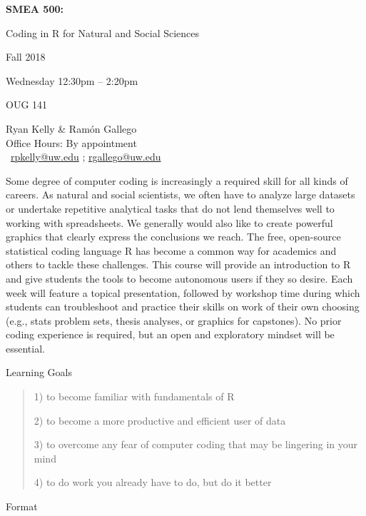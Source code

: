 \documentclass[11pt,letterpaper]{article}
\newcommand{\R}[0]{\textsf{R }}
\begin{document}
\begin{center} 
 {\titlefont
		
		\Huge
		\textbf{SMEA 500:}
		
		Coding in \R for Natural and Social Sciences
}

\large
Fall 2018
	
Wednesday 12:30pm -- 2:20pm

OUG 141

{\titlefont
		Ryan Kelly \& Ramón Gallego\\
		Office Hours: By appointment\\
		\Letter\ \href{mailto:rpkelly@uw.edu}{rpkelly@uw.edu} ; \href{mailto:rgallego@uw.edu}{rgallego@uw.edu}		
}

\end{center}
\setlength{\parskip}{1em}


Some degree of computer coding is increasingly a required skill for all kinds of careers. As natural and social scientists, we often have to analyze large datasets or undertake repetitive analytical tasks that do not lend themselves well to working with spreadsheets. We generally would also like to create powerful graphics that clearly express the conclusions we reach. The free, open-source statistical coding language \R has become a common way for academics and others to tackle these challenges. This course will provide an introduction to \R and give students the tools to become autonomous users if they so desire. Each week will feature a topical presentation, followed by workshop time during which students can troubleshoot and practice their skills on work of their own choosing (e.g., stats problem sets, thesis analyses, or graphics for capstones). No prior coding experience is required, but an open and exploratory mindset will be essential. 

\vspace{1em}

{\Large Learning Goals}\hrulefill
\begin{quote} %

1) to become familiar with fundamentals of \R

2) to become a more productive and efficient user of data

3) to overcome any fear of computer coding that may be lingering in your mind

4) to do work you already have to do, but do it better
\end{quote}
{\Large Format}\hrulefill
\end{document}
